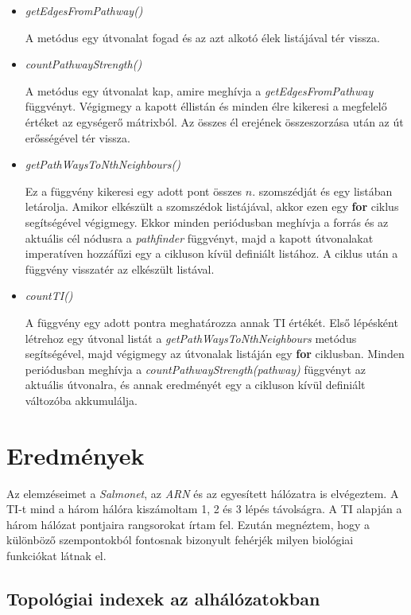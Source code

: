 \documentclass[a4paper,12pt]{article}
\begin{document}
\begin{itemize}
			\item \textit{getEdgesFromPathway()}
			
			A metódus egy útvonalat fogad és az azt alkotó élek listájával tér vissza. 
			
			\item \textit{countPathwayStrength()}
			
			A metódus egy útvonalat kap, amire meghívja a \textit{getEdgesFromPathway} függvényt. Végigmegy a kapott éllistán és minden élre kikeresi a megfelelő értéket az egységerő mátrixból. Az összes él erejének összeszorzása után az út erősségével tér vissza.
			
			\item \textit{getPathWaysToNthNeighbours()}
			
			Ez a függvény kikeresi egy adott pont összes $n$. szomszédját és egy listában letárolja. Amikor elkészült a szomszédok listájával, akkor ezen egy \textbf{for} ciklus segítségével végigmegy. Ekkor minden periódusban meghívja a forrás és az aktuális cél nódusra a \textit{pathfinder} függvényt, majd a kapott útvonalakat imperatíven hozzáfűzi egy a cikluson kívül definiált listához. A ciklus után a függvény visszatér az elkészült listával.
			
			\item \textit{countTI()}
			
			A függvény egy adott pontra meghatározza annak TI értékét. Első lépésként létrehoz egy útvonal listát a \textit{getPathWaysToNthNeighbours} metódus segítségével, majd végigmegy az útvonalak listáján egy \textbf{for} ciklusban. Minden periódusban meghívja a \textit{countPathwayStrength(pathway)} függvényt az aktuális útvonalra, és annak eredményét egy a cikluson kívül definiált változóba akkumulálja.
			
		\end{itemize}
		\pagebreak


\section{Eredmények}

	Az elemzéseimet a \textit{Salmonet}, az \textit{ARN} és az egyesített hálózatra is elvégeztem. A TI-t mind a három hálóra kiszámoltam 1, 2 és 3 lépés távolságra. A TI alapján a három hálózat pontjaira rangsorokat írtam fel. Ezután megnéztem, hogy a különböző szempontokból fontosnak bizonyult fehérjék milyen biológiai funkciókat látnak el.
	
	\subsection{Topológiai indexek az alhálózatokban}
\end{document}
